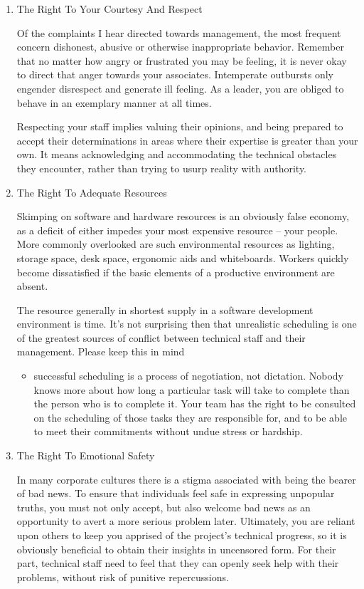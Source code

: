 \documentclass{article}
\begin{document}
\begin{enumerate}
\item The Right To Your Courtesy And Respect
\label{sec:orgheadline136}

Of the complaints I hear directed towards management, the most frequent
concern dishonest, abusive or otherwise inappropriate behavior. Remember
that no matter how angry or frustrated you may be feeling, it is never
okay to direct that anger towards your associates. Intemperate outbursts
only engender disrespect and generate ill feeling. As a leader, you are
obliged to behave in an exemplary manner at all times.

Respecting your staff implies valuing their opinions, and being prepared
to accept their determinations in areas where their expertise is greater
than your own. It means acknowledging and accommodating the technical
obstacles they encounter, rather than trying to usurp reality with
authority.

\item The Right To Adequate Resources
\label{sec:orgheadline137}

Skimping on software and hardware resources is an obviously false
economy, as a deficit of either impedes your most expensive resource --
your people. More commonly overlooked are such environmental resources
as lighting, storage space, desk space, ergonomic aids and whiteboards.
Workers quickly become dissatisfied if the basic elements of a
productive environment are absent.

The resource generally in shortest supply in a software development
environment is time. It's not surprising then that unrealistic
scheduling is one of the greatest sources of conflict between technical
staff and their management. Please keep this in mind

\begin{itemize}
\item successful scheduling is a process of negotiation, not dictation.
Nobody knows more about how long a particular task will take to
complete than the person who is to complete it. Your team has the
right to be consulted on the scheduling of those tasks they are
responsible for, and to be able to meet their commitments without
undue stress or hardship.
\end{itemize}

\item The Right To Emotional Safety
\label{sec:orgheadline138}

In many corporate cultures there is a stigma associated with being the
bearer of bad news. To ensure that individuals feel safe in expressing
unpopular truths, you must not only accept, but also welcome bad news as
an opportunity to avert a more serious problem later. Ultimately, you
are reliant upon others to keep you apprised of the project's technical
progress, so it is obviously beneficial to obtain their insights in
uncensored form. For their part, technical staff need to feel that they
can openly seek help with their problems, without risk of punitive
repercussions.


\end{enumerate}
\end{document}
